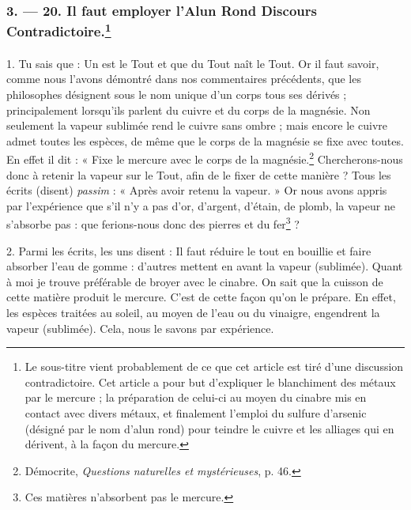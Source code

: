 \documentclass[a4paper, 11pt, oneside, polutonikogreek, french]{article}
\begin{document}
\bigskip
\centerline{\EightStarTaper}
\centerline{\EightStarTaper\EightStarTaper}
\bigskip

\subsubsection[3. --- 20. Il faut employer l'Alun Rond Discours Contradictoire.]{3. --- 20. Il faut employer l'Alun Rond Discours Contradictoire.\footnote{Le sous-titre vient probablement de ce que cet article est tiré d'une discussion contradictoire. Cet article a pour but d'expliquer le blanchiment des métaux par le mercure ; la préparation de celui-ci au moyen du cinabre mis en contact avec divers métaux, et finalement l'emploi du sulfure d'arsenic (désigné par le nom d'alun rond) pour teindre le cuivre et les alliages qui en dérivent, à la façon du mercure.}}
\paragraph{}
1. Tu sais que : Un est le Tout et que du Tout naît le Tout. Or il faut savoir, comme nous l'avons démontré dans nos commentaires précédents, que les philosophes désignent sous le nom unique d'un corps tous ses dérivés ; principalement lorsqu'ils parlent du cuivre et du corps de la magnésie. Non seulement la vapeur sublimée rend le cuivre sans ombre ; mais encore le cuivre admet toutes les espèces, de même que le corps de la magnésie se fixe avec toutes. En effet il dit : « Fixe le mercure avec le corps de la magnésie.\footnote{Démocrite, \emph{Questions naturelles et mystérieuses}, p. 46.} Chercherons-nous donc à retenir la vapeur sur le Tout, afin de le fixer de cette manière ? Tous les écrits (disent) \emph{passim} : « Après avoir retenu la vapeur. » Or nous avons appris par l'expérience que s'il n'y a pas d'or, d'argent, d'étain, de plomb, la vapeur ne s'absorbe pas : que ferions-nous donc des pierres et du fer\footnote{Ces matières n'absorbent pas le mercure.} ?

2. Parmi les écrits, les uns disent : Il faut réduire le tout en bouillie et faire absorber l'eau de gomme : d'autres mettent en avant la vapeur (sublimée). Quant à moi je trouve préférable de broyer avec le cinabre. On sait que la cuisson de cette matière produit le mercure. C'est de cette façon qu'on le prépare. En effet, les espèces traitées au soleil, au moyen de l'eau ou du vinaigre, engendrent la vapeur (sublimée). Cela, nous le savons par expérience.
\end{document}
